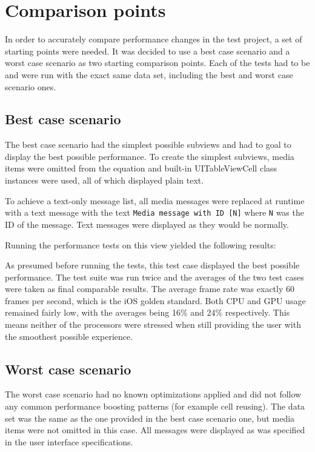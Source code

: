 \documentclass[a4paper,12pt]{article}
\begin{document}
\newpage
\section{Comparison points}
In order to accurately compare performance changes in the test project, a set of starting points were needed. It was decided to use a best case scenario and a worst case scenario as two starting comparison points. Each of the tests had to be and were run with the exact same data set, including the best and worst case scenario ones.

\subsection{Best case scenario}
\label{sec:best-case-scenario}
The best case scenario had the simplest possible subviews and had to goal to display the best possible performance. To create the simplest subviews, media items were omitted from the equation and built-in UITableViewCell class instances were used, all of which displayed plain text.

To achieve a text-only message list, all media messages were replaced at runtime with a text message with the text \texttt{Media message with ID [N]} where \texttt{N} was the ID of the message. Text messages were displayed as they would be normally.

Running the performance tests on this view yielded the following results:

As presumed before running the tests, this test case displayed the best possible performance. The test suite was run twice and the averages of the two test cases were taken as final comparable results. The average frame rate was exactly 60 frames per second, which is the iOS golden standard\cite{IntroducingAsyncDisplayKit}. Both CPU and GPU usage remained fairly low, with the averages being 16\% and 24\% respectively. This means neither of the processors were stressed when still providing the user with the smoothest possible experience.

\subsection{Worst case scenario}
\label{sec:worst-case-scenario}
The worst case scenario had no known optimizations applied and did not follow any common performance boosting patterns (for example cell reusing). The data set was the same as the one provided in the best case scenario one, but media items were not omitted in this case. All messages were displayed as was specified in the user interface specifications.
\end{document}
